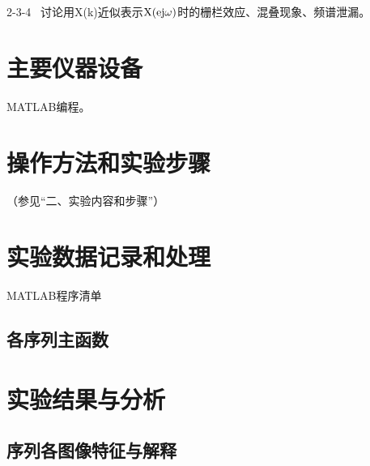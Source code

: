 \documentclass{../source/Experiment}
\begin{document}
    2-3-4 \, 讨论用X(k)近似表示$\rm  X(ej\omega)$时的栅栏效应、混叠现象、频谱泄漏。


    \section{主要仪器设备}
    
    MATLAB编程。

    \section{操作方法和实验步骤}

    （参见“二、实验内容和步骤”）

    \section{实验数据记录和处理}
    
        MATLAB程序清单
        \subsection{各序列主函数}
            
    \section{实验结果与分析}
        \subsection{序列各图像特征与解释}

            
 
\end{document}
